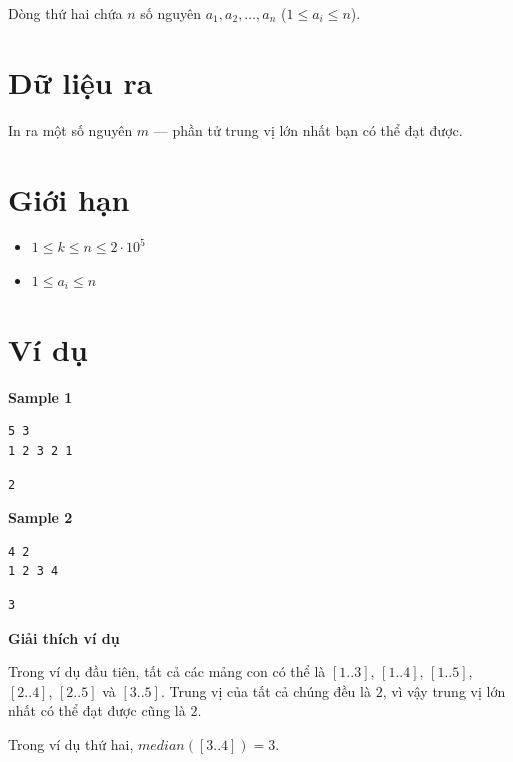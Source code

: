 \documentclass[12pt,a4paper]{article}
\newcommand{\explanation}{%
  \vspace{6pt}\textbf{\textcolor{sectioncolor}{Giải thích ví dụ}}\par\vspace{2pt}%
}
\begin{document}
Dòng thứ hai chứa $n$ số nguyên $a_1, a_2, \ldots, a_n$ ($1 \leq a_i \leq n$).

\section*{Dữ liệu ra}
In ra một số nguyên $m$ — phần tử trung vị lớn nhất bạn có thể đạt được.

\section*{Giới hạn}
\begin{constraintbox}
\begin{itemize}[leftmargin=*]
    \item $1 \leq k \leq n \leq 2 \cdot 10^5$
    \item $1 \leq a_i \leq n$
\end{itemize}
\end{constraintbox}

\section*{Ví dụ}
\textbf{Sample 1}
\begin{inputbox}
\begin{verbatim}
5 3
1 2 3 2 1
\end{verbatim}
\end{inputbox}
\begin{outputbox}
\begin{verbatim}
2
\end{verbatim}
\end{outputbox}

\textbf{Sample 2}
\begin{inputbox}
\begin{verbatim}
4 2
1 2 3 4
\end{verbatim}
\end{inputbox}
\begin{outputbox}
\begin{verbatim}
3
\end{verbatim}
\end{outputbox}

\explanation
Trong ví dụ đầu tiên, tất cả các mảng con có thể là $[1..3]$, $[1..4]$, $[1..5]$, $[2..4]$, $[2..5]$ và $[3..5]$. Trung vị của tất cả chúng đều là $2$, vì vậy trung vị lớn nhất có thể đạt được cũng là $2$.

Trong ví dụ thứ hai, $median([3..4]) = 3$.
\end{document}
